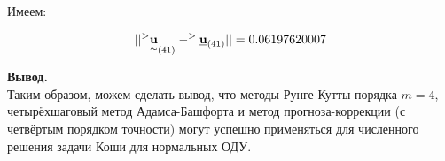 \documentclass[14pt,a4paper]{scrartcl}
\begin{document}
Имеем:

\begin{equation*}
	|| ^>\underset{\sim}{\textbf{u}}_{(41)} -  ^>\textbf{\underline{u}}_{(41)} || = 0.06197620007
\end{equation*}




\textbf{Вывод.}\\
Таким образом, можем сделать вывод, что методы Рунге-Кутты порядка $m=4$, четырёхшаговый метод Адамса-Башфорта и метод прогноза-коррекции (с четвёртым порядком точности) могут успешно применяться для численного решения задачи Коши для нормальных ОДУ.
\end{document}

